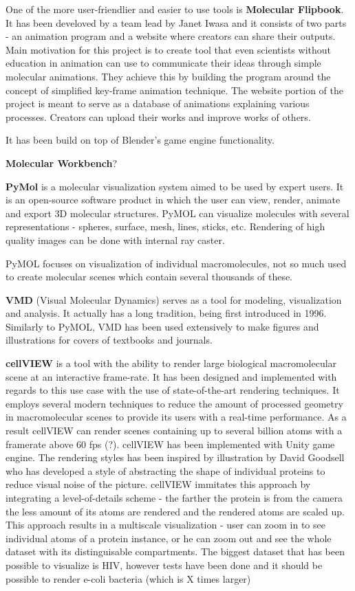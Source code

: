 \documentclass[
  digital, %
  table,   %
  nolof,     %
  nolot,     %
]{fithesis3}
\begin{document}
One of the more user-friendlier and easier to use tools is \textbf{Molecular Flipbook}. It has been develoved by a team lead by Janet Iwasa and it consists of two parts - an animation program and a website where creators can share their outputs. Main motivation for this project is to create tool that even scientists without education in animation can use to communicate their ideas through simple molecular animations. They achieve this by building the program around the concept of simplified key-frame animation technique. The website portion of the project is meant to serve as a database of animations explaining various processes. Creators can upload their works and improve works of others.

It has been build on top of Blender's game engine functionality.

\textbf{Molecular Workbench}?

\textbf{PyMol}\cite{PyMOL} is a molecular visualization system aimed to be used by expert users. It is an open-source software product in which the user can view, render, animate and export 3D molecular structures. PyMOL can visualize molecules with several representations - spheres, surface, mesh, lines, sticks, etc. Rendering of high quality images can be done with internal ray caster.

PyMOL focuses on visualization of individual macromolecules, not so much used to create molecular scenes which contain several thousands of these.

\textbf{VMD} (Visual Molecular Dynamics)\cite{HUMP96} serves as a tool for modeling, visualization and analysis. It actually has a long tradition, being first introduced in 1996. Similarly to PyMOL, VMD has been used extensively to make figures and illustrations for covers of textbooks and journals.

\textbf{cellVIEW}\cite{cellVIEW_2015} is a tool with the ability to render large biological macromolecular scene at an interactive frame-rate. It has been designed and implemented with regards to this use case with the use of state-of-the-art rendering techniques. It employs several modern techniques to reduce the amount of processed geometry in macromolecular scenes to provide its users with a real-time performance. As a result cellVIEW can render scenes containing up to several billion atoms with a framerate above 60 fps (?). cellVIEW has been implemented with Unity game engine. The rendering styles has been inspired by illustration by David Goodsell who has developed a style of abstracting the shape of individual proteins to reduce visual noise of the picture. cellVIEW immitates this approach by integrating a level-of-details scheme - the farther the protein is from the camera the less amount of its atoms are rendered and the rendered atoms are scaled up. This approach results in a multiscale visualization - user can zoom in to see individual atoms of a protein instance, or he can zoom out and see the whole dataset with its distinguisable compartments. The biggest dataset that has been possible to visualize is HIV, however tests have been done and it should be possible to render e-coli bacteria (which is X times larger)
\end{document}

